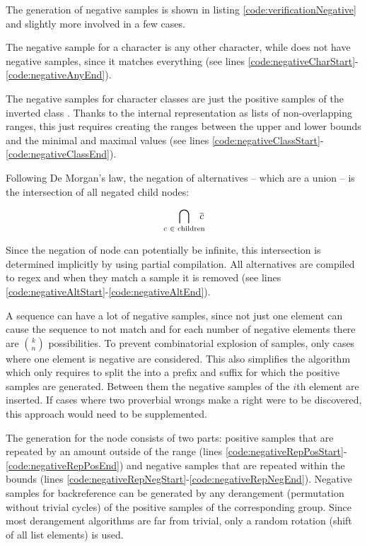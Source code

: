 The generation of negative samples is shown in listing \ref{code:verificationNegative} and slightly more involved in a few cases.

The negative sample for a character is any other character, while  does not have negative samples, since it matches everything (see lines \ref{code:negativeCharStart}-\ref{code:negativeAnyEnd}).

The negative samples for character classes are just the positive samples of the inverted class . Thanks to the internal representation as lists of non-overlapping ranges, this just requires creating the ranges between the upper and lower bounds and the minimal and maximal values (see lines \ref{code:negativeClassStart}-\ref{code:negativeClassEnd}).

Following De Morgan's law, the negation of alternatives -- which are a union -- is the intersection of all negated child nodes:

\vspace{-1em}
\begin{equation*}
    \bigcap_{\text{c } \in \text{ children}} \hspace{-.7em}\overline{c}
\end{equation*}
\vspace{-1em}

Since the negation of node can potentially be infinite, this intersection is determined implicitly by using partial compilation. All alternatives are compiled to regex and when they match a sample it is removed (see lines \ref{code:negativeAltStart}-\ref{code:negativeAltEnd}).

A sequence can have a lot of negative samples, since not just one element can cause the sequence to not match and for each number of negative elements there are ${k}\choose{n}$ possibilities. To prevent combinatorial explosion of samples, only cases where one element is negative are considered. This also simplifies the algorithm which only requires to split the  into a prefix and suffix for which the positive samples are generated. Between them the negative samples of the $i$th element are inserted. If cases where two proverbial wrongs make a right were to be discovered, this approach would need to be supplemented.

The generation for the  node consists of two parts: positive samples that are repeated by an amount outside of the range (lines \ref{code:negativeRepPosStart}-\ref{code:negativeRepPosEnd}) and negative samples that are repeated within the bounds (lines \ref{code:negativeRepNegStart}-\ref{code:negativeRepNegEnd}).
Negative samples for backreference can be generated by any derangement (permutation without trivial cycles) of the positive samples of the corresponding group. Since most derangement algorithms are far from trivial, only a random rotation (shift of all list elements) is used.

